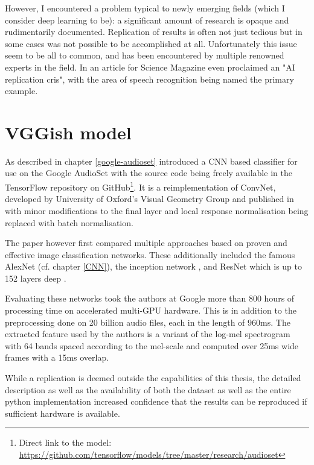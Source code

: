 However, I encountered a problem typical to newly emerging fields (which I consider deep learning to be): a significant amount of research is opaque and rudimentarily documented. Replication of results is often not just tedious but in some cases was not possible to be accomplished at all.
Unfortunately this issue seem to be all to common, and has been encountered by multiple renowned experts in the field. In an article for Science Magazine \cite{Hutson2018} even proclaimed an "AI replication cris", with the area of speech recognition being named the primary example.



\section{VGGish model}
\label{vggish}


As described in chapter \ref{google-audioset} \cite{45611} introduced a CNN based classifier for use on the Google AudioSet with the source code being freely available in the TensorFlow repository on GitHub\footnote{Direct link to the model: \url{https://github.com/tensorflow/models/tree/master/research/audioset}}. It is a reimplementation of ConvNet, developed by University of Oxford's Visual Geometry Group and published in \cite{DBLP:journals/corr/SimonyanZ14a} with minor modifications to the final layer and local response normalisation being replaced with batch normalisation.

The paper however first compared multiple approaches based on proven and effective image classification networks. These additionally included the famous AlexNet \cite{AlexNet} (cf. chapter \ref{CNN}), the inception network \cite{DBLP:journals/corr/SzegedyVISW15}, and ResNet which is up to 152 layers deep \cite{DBLP:journals/corr/HeZRS15}.

Evaluating these networks took the authors at Google more than 800 hours of processing time on accelerated multi-GPU hardware. This is in addition to the preprocessing done on 20 billion audio files, each in the length of 960ms. The extracted feature used by the authors is a variant of the log-mel spectrogram with 64 bands spaced according to the mel-scale and computed over 25ms wide frames with a 15ms overlap. 

 While a replication is deemed outside the capabilities of this thesis, the detailed description as well as the availability of both the dataset as well as the entire python implementation increased confidence that the results can be reproduced if sufficient hardware is available.
 
